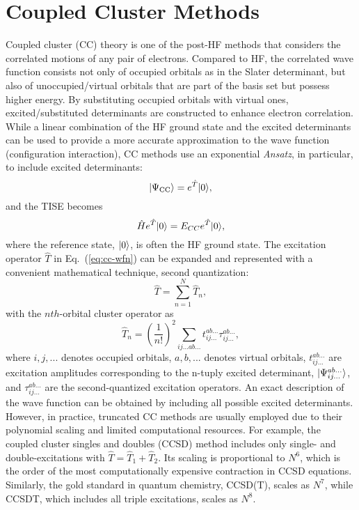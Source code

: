 \section{Coupled Cluster Methods}\label{cc}
Coupled cluster (CC) theory\cite{Crawford2000} is one of the post-HF methods that considers the correlated motions of any pair of electrons. Compared to HF, the correlated wave function consists not only of occupied orbitals as in the Slater determinant, but also of unoccupied/virtual orbitals that are part of the basis set but possess higher energy. By substituting occupied orbitals with virtual ones, excited/substituted determinants are constructed to enhance electron correlation. While a linear combination of the HF ground state and the excited determinants can be used to provide a more accurate approximation to the wave function (configuration interaction), CC methods use an exponential \textit{Ansatz}, in particular, to include excited determinants:
\begin{equation}
| \Psi_{\rm CC} \rangle = e^{\hat{T}} | 0 \rangle,
\label{eq:cc-wfn}
\end{equation}
and the TISE becomes
\begin{equation}
\hat{H}e^{\hat{T}} | 0 \rangle = E_{CC}e^{\hat{T}} | 0 \rangle,
\end{equation}
where the reference state, $| 0 \rangle$, is often the HF ground state. The excitation operator $\hat{T}$ in Eq.~(\ref{eq:cc-wfn}) can be expanded and represented with a convenient mathematical technique, second quantization:\cite{Dirac1927}   
\begin{equation}
\hat{T} = \sum_{n=1}^{N}\hat{T}_{n},
\end{equation}
with the $nth$-orbital cluster operator as
\begin{equation}
\hat{T}_{n} = \left( \frac{1}{n!} \right) ^{2}\sum_{ij...ab...}t_{ij...}^{ab...}\tau_{ij...}^{ab...},
\end{equation}
where $i, j, ...$ denotes occupied orbitals, $a, b, ...$ denotes virtual orbitals, $t_{ij...}^{ab...}$ are excitation amplitudes corresponding to the n-tuply excited determinant, $| \Psi_{ij...}^{ab...} \rangle$, and $\tau_{ij...}^{ab...}$ are the second-quantized excitation operators. An exact description of the wave function can be obtained by including all possible excited determinants. However, in practice, truncated CC methods are usually employed due to their polynomial scaling and limited computational resources. For example, the coupled cluster singles and doubles (CCSD) method includes only single- and double-excitations with $\hat{T}=\hat{T}_{1}+\hat{T}_{2}$. Its scaling is proportional to $N^{6}$, which is the order of the most computationally expensive contraction in CCSD equations. Similarly, the gold standard in quantum chemistry, CCSD(T),\cite{Raghavachari1989} scales as $N^{7}$, while CCSDT,\cite{Noga1987} which includes all triple excitations, scales as $N^{8}$.


